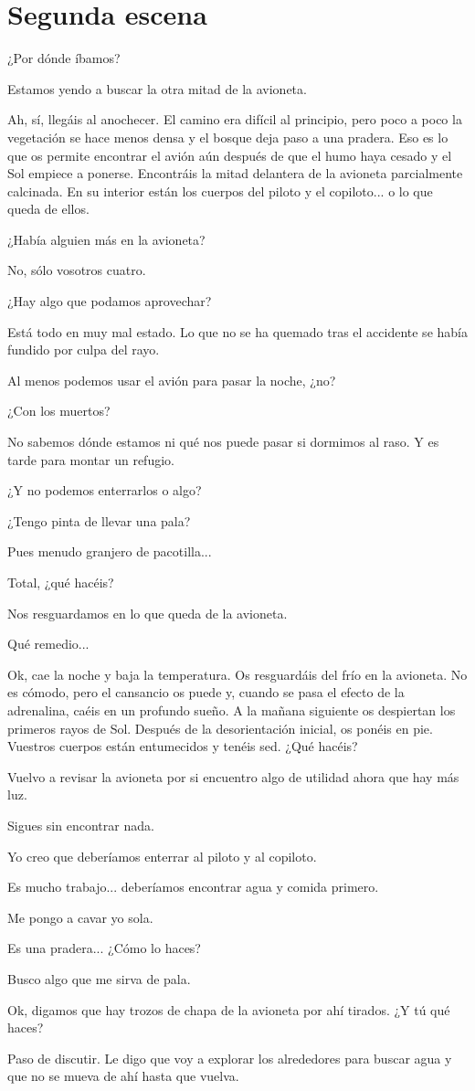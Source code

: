 \documentclass[10pt, a5paper, twocolumn]{article}
\newenvironment{dialogue}
    {\begin{description}[leftmargin=!,align=right,labelwidth=0.cm]}
    {\end{description}}
\newcommand\A{\item[\raisebox{-0.25em}{\scalebox{0.75}{\bctetraedre}}]}
\newcommand\B{\item[\raisebox{-0.25em}{\scalebox{0.75}{\bccube}}]}
\newcommand\E{\item[\raisebox{-0.25em}{\scalebox{0.75}{\bcicosaedre}}]}
\begin{document}
    \section*{Segunda escena} %

    \begin{dialogue}
        \E ¿Por dónde íbamos?
        \A Estamos yendo a buscar la otra mitad de la avioneta.
        \E Ah, sí, llegáis al anochecer. El camino era difícil al principio, pero poco a poco la vegetación se hace menos densa y el bosque deja paso a una pradera. Eso es lo que os permite encontrar el avión aún después de que el humo haya cesado y el Sol empiece a ponerse. Encontráis la mitad delantera de la avioneta parcialmente calcinada. En su interior están los cuerpos del piloto y el copiloto... o lo que queda de ellos.
        \A ¿Había alguien más en la avioneta?
        \E No, sólo vosotros cuatro.
        \B ¿Hay algo que podamos aprovechar?
        \E Está todo en muy mal estado. Lo que no se ha quemado tras el accidente se había fundido por culpa del rayo.
        \B Al menos podemos usar el avión para pasar la noche, ¿no?
        \A ¿Con los muertos?
        \B No sabemos dónde estamos ni qué nos puede pasar si dormimos al raso. Y es tarde para montar un refugio.
        \A ¿Y no podemos enterrarlos o algo?
        \B ¿Tengo pinta de llevar una pala?
        \A Pues menudo granjero de pacotilla...
        \E Total, ¿qué hacéis?
        \B Nos resguardamos en lo que queda de la avioneta.
        \A Qué remedio...
        \E Ok, cae la noche y baja la temperatura. Os resguardáis del frío en la avioneta. No es cómodo, pero el cansancio os puede y, cuando se pasa el efecto de la adrenalina, caéis en un profundo sueño. A la mañana siguiente os despiertan los primeros rayos de Sol. Después de la desorientación inicial, os ponéis en pie. Vuestros cuerpos están entumecidos y tenéis sed. ¿Qué hacéis?
        \B Vuelvo a revisar la avioneta por si encuentro algo de utilidad ahora que hay más luz.
        \E Sigues sin encontrar nada.
        \A Yo creo que deberíamos enterrar al piloto y al copiloto.
        \B Es mucho trabajo... deberíamos encontrar agua y comida primero.
        \A Me pongo a cavar yo sola.
        \E Es una pradera... ¿Cómo lo haces?
        \A Busco algo que me sirva de pala.
        \E Ok, digamos que hay trozos de chapa de la avioneta por ahí tirados. ¿Y tú qué haces?
        \B Paso de discutir. Le digo que voy a explorar los alrededores para buscar agua y que no se mueva de ahí hasta que vuelva.

\end{dialogue}
\end{document}
